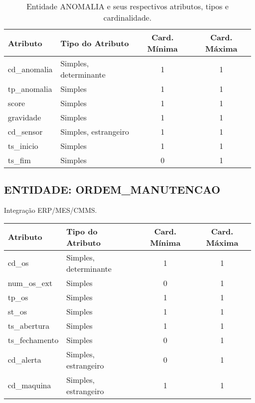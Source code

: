 \documentclass[10pt,a4paper]{article}
\begin{document}
\begin{table}[h!]
\centering
\begin{tabular}{| l | l | c | c |}
\hline
\rowcolor{red}\color{white}\textbf{Atributo} & \color{white}\textbf{Tipo do Atributo} & \color{white}\textbf{Card. Mínima} & \color{white}\textbf{Card. Máxima} \\
\hline
cd\_anomalia & Simples, determinante & 1 & 1 \\
tp\_anomalia & Simples & 1 & 1 \\
score & Simples & 1 & 1 \\
gravidade & Simples & 1 & 1 \\
cd\_sensor & Simples, estrangeiro & 1 & 1 \\
ts\_inicio & Simples & 1 & 1 \\
ts\_fim & Simples & 0 & 1 \\
\hline
\end{tabular}
\caption{Entidade ANOMALIA e seus respectivos atributos, tipos e cardinalidade.}
\label{tab:anomalia}
\end{table}

\subsection*{ENTIDADE: ORDEM\_MANUTENCAO}
Integração ERP/MES/CMMS.
\begin{center}
\begin{tabular}{| l | l | c | c |}
\hline
\rowcolor{red}\color{white}\textbf{Atributo} & \color{white}\textbf{Tipo do Atributo} & \color{white}\textbf{Card. Mínima} & \color{white}\textbf{Card. Máxima} \\
\hline
cd\_os & Simples, determinante & 1 & 1 \\
num\_os\_ext & Simples & 0 & 1 \\
tp\_os & Simples & 1 & 1 \\
st\_os & Simples & 1 & 1 \\
ts\_abertura & Simples & 1 & 1 \\
ts\_fechamento & Simples & 0 & 1 \\
cd\_alerta & Simples, estrangeiro & 0 & 1 \\
cd\_maquina & Simples, estrangeiro & 1 & 1 \\
\hline
\end{tabular}
\end{center}
\end{document}
